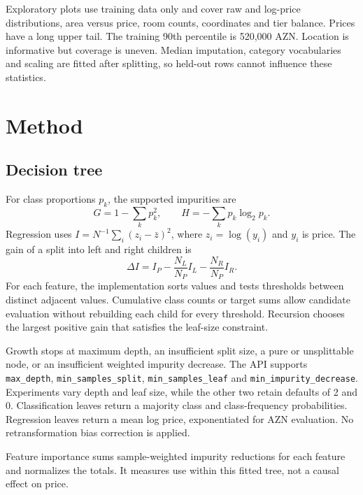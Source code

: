 \documentclass[10pt,twocolumn,a4paper]{article}
\begin{document}
Exploratory plots use training data only and cover raw and log-price distributions, area versus price, room counts, coordinates and tier balance. Prices have a long upper tail. The training 90th percentile is 520,000 AZN. Location is informative but coverage is uneven. Median imputation, category vocabularies and scaling are fitted after splitting, so held-out rows cannot influence these statistics.

\section{Method}
\subsection{Decision tree}
For class proportions $p_k$, the supported impurities are
\begin{equation}
G=1-\sum_k p_k^2,\qquad H=-\sum_k p_k\log_2 p_k.
\end{equation}
Regression uses $I=N^{-1}\sum_i(z_i-\bar z)^2$, where $z_i=\log(y_i)$ and $y_i$ is price. The gain of a split into left and right children is
\begin{equation}
\Delta I=I_P-\frac{N_L}{N_P}I_L-\frac{N_R}{N_P}I_R.
\end{equation}
For each feature, the implementation sorts values and tests thresholds between distinct adjacent values. Cumulative class counts or target sums allow candidate evaluation without rebuilding each child for every threshold. Recursion chooses the largest positive gain that satisfies the leaf-size constraint.

Growth stops at maximum depth, an insufficient split size, a pure or unsplittable node, or an insufficient weighted impurity decrease. The API supports \texttt{max\_depth}, \texttt{min\_samples\_split}, \texttt{min\_samples\_leaf} and \texttt{min\_impurity\_decrease}. Experiments vary depth and leaf size, while the other two retain defaults of 2 and 0. Classification leaves return a majority class and class-frequency probabilities. Regression leaves return a mean log price, exponentiated for AZN evaluation. No retransformation bias correction is applied.

Feature importance sums sample-weighted impurity reductions for each feature and normalizes the totals. It measures use within this fitted tree, not a causal effect on price.
\end{document}
